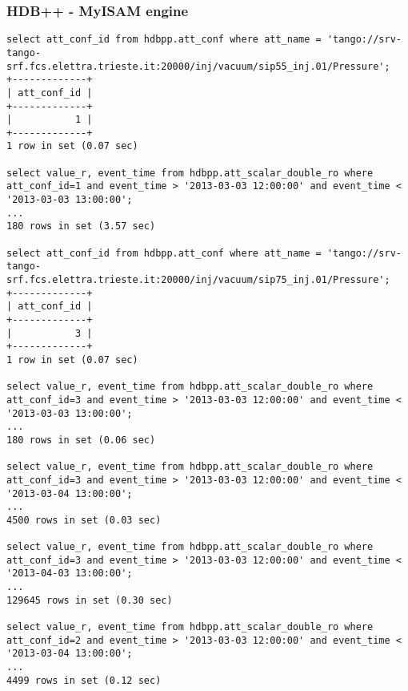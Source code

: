 \documentclass[11pt,a4paper]{article}
\def \hdb{HDB++}
\begin{document}
\subsubsection{\hdb{} - MyISAM engine}
\begin{lstlisting}
select att_conf_id from hdbpp.att_conf where att_name = 'tango://srv-tango-srf.fcs.elettra.trieste.it:20000/inj/vacuum/sip55_inj.01/Pressure';
+-------------+
| att_conf_id |
+-------------+
|           1 |
+-------------+
1 row in set (0.07 sec)

select value_r, event_time from hdbpp.att_scalar_double_ro where att_conf_id=1 and event_time > '2013-03-03 12:00:00' and event_time < '2013-03-03 13:00:00';
...
180 rows in set (3.57 sec)

select att_conf_id from hdbpp.att_conf where att_name = 'tango://srv-tango-srf.fcs.elettra.trieste.it:20000/inj/vacuum/sip75_inj.01/Pressure';
+-------------+
| att_conf_id |
+-------------+
|           3 |
+-------------+
1 row in set (0.07 sec)

select value_r, event_time from hdbpp.att_scalar_double_ro where att_conf_id=3 and event_time > '2013-03-03 12:00:00' and event_time < '2013-03-03 13:00:00';
...
180 rows in set (0.06 sec)

select value_r, event_time from hdbpp.att_scalar_double_ro where att_conf_id=3 and event_time > '2013-03-03 12:00:00' and event_time < '2013-03-04 13:00:00';
...
4500 rows in set (0.03 sec)

select value_r, event_time from hdbpp.att_scalar_double_ro where att_conf_id=3 and event_time > '2013-03-03 12:00:00' and event_time < '2013-04-03 13:00:00';
...
129645 rows in set (0.30 sec)

select value_r, event_time from hdbpp.att_scalar_double_ro where att_conf_id=2 and event_time > '2013-03-03 12:00:00' and event_time < '2013-03-04 13:00:00';
...
4499 rows in set (0.12 sec)
\end{lstlisting}
\end{document}
